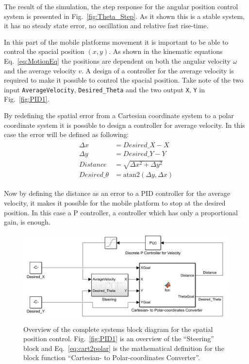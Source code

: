 The result of the simulation, the step response for the angular position control system is presented in Fig.~\ref{fig:Theta_Step}.
As it shown this is a stable system, it has no steady state error, no oscillation and relative fast rise-time.

In this part of the mobile platforms movement it is important to be able to control the spacial position $(x, y)$.
As shown in the kinematic equations Eq.~\eqref{eq:MotionEq} the positions are dependent on both the angular velocity $\omega$ and the average velocity $v$.
A design of a controller for the average velocity is required to make it possible to control the spacial position.
Take note of the two input \texttt{AverageVelocity}, \texttt{Desired\_Theta} and the two output \texttt{X}, \texttt{Y} in Fig.~\ref{fig:PID1}.

By redefining the spatial error from a Cartesian coordinate system to a polar coordinate system it is possible to design a controller for average velocity.
In this case the error will be defined as following:
\begin{eqnarray}
\begin{aligned}
\Delta x &= Desired\_X - X\\
\Delta y &= Desired\_Y - Y\\
Distance &= \sqrt{\Delta x^2 + \Delta y^2}\\
Desired\_\theta &= \text{atan2}(\Delta y, \Delta x)
\end{aligned}
\label{eq:cart2polar}
\end{eqnarray}

Now by defining the distance as an error to a PID controller for the average velocity, it makes it possible for the mobile platform to stop at the desired position.
In this case a P controller, a controller which has only a proportional gain, is enough.
\begin{figure}[h]
\centering
\includegraphics[width=\textwidth]{sections/assets/V_PID.PNG}
\caption{Overview of the complete systems block diagram for the spatial position control. Fig.~\ref{fig:PID1} is an overview of the ``Steering'' block and Eq.~\eqref{eq:cart2polar} is the mathematical definition for the block function ``Cartesian- to Polar-coordinates Converter''.}
\label{fig:V_PID}
\end{figure}

